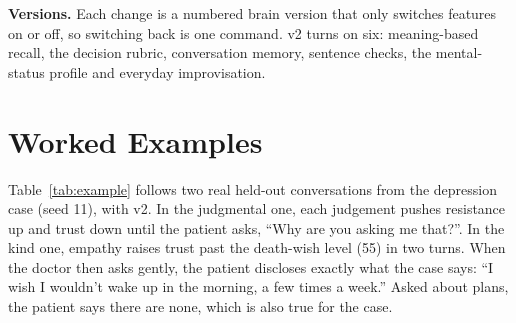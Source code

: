 \documentclass[conference]{IEEEtran}
\begin{document}
\textbf{Versions.} Each change is a numbered brain version that only switches features on or off, so switching back is one command. v2 turns on
six: meaning-based recall, the decision rubric, conversation memory, sentence checks, the mental-status profile and everyday improvisation.

\section{Worked Examples}
Table~\ref{tab:example} follows two real held-out conversations from the depression case (seed 11), with v2. In the judgmental one, each
judgement pushes resistance up and trust down until the patient asks, ``Why are you asking me that?''. In the kind one, empathy raises trust past the death-wish level (55) in two turns. When the doctor then asks gently, the patient discloses exactly what the case says: ``I wish I
wouldn't wake up in the morning, a few times a week.'' Asked about plans, the patient says there are none, which is also true for the case.
\end{document}
